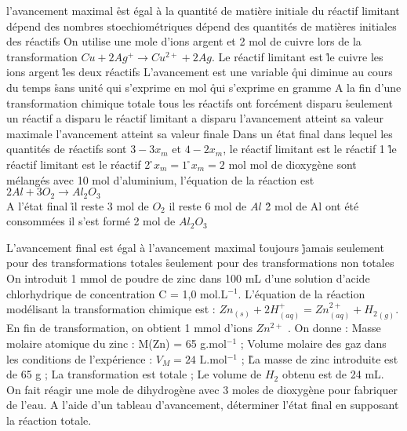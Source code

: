 \q l'avancement maximal 
\r est égal à la quantité de matière initiale du réactif limitant 
\rv dépend des nombres stoechiométriques 
\rv dépend des quantités de matières initiales des réactifs 
\q On utilise une mole d'ions argent et 2 mol de cuivre lors de la transformation $Cu+2Ag^+\longrightarrow Cu^{2+}+2Ag$. Le réactif limitant est 
\r le cuivre 
\rv les ions argent 
\r les deux réactifs 
L'avancement est une variable 
\r qui diminue au cours du temps 
\r sans unité 
\rv qui s'exprime en mol 
\r qui s'exprime en gramme 
\q A la fin d'une transformation chimique totale
\r tous les réactifs ont forcément disparu
\r  seulement un réactif a disparu 
\rv le réactif limitant a disparu 
\rv l'avancement atteint sa valeur maximale
\rv l'avancement atteint sa valeur finale 
\q Dans un état final dans lequel les quantités de réactifs sont $3 - 3 x_m$ et $4 - 2 x_m$,  
\rv le réactif limitant est le réactif 1 
\r le réactif limitant est le réactif 2
\r $x_m=1$ 
\r $x_m=2$ mol 
 mol de dioxygène sont mélangés avec 10 mol d'aluminium, l'équation de la réaction est $2Al+3O_2\rightarrow Al_2O_3$\\ A l'état final 
\r il reste 3 mol de $O_2$ 
\rv il reste 6 mol de $Al$ 
\r 2 mol de Al ont été consommées
\rv il s'est formé 2 mol de $Al_2O_3$

\q L'avancement final est égal à l'avancement maximal 
\r toujours 
\r jamais 
\rv seulement pour des transformations totales 
\r seulement pour des transformations non totales
\q	
On introduit 1 mmol de poudre de zinc dans 100 mL d’une solution d’acide chlorhydrique de concentration C = 1,0 mol.L$^{-1}$. L’équation de la réaction modélisant la transformation chimique est : $Zn_{(s)} + 2 H^+_{(aq)} = Zn^{2+}_{(aq)} + {H_2}_{(g)} $.
En fin de transformation, on obtient 1 mmol d’ions $Zn^{2+}$ .
On donne : 	Masse molaire atomique du zinc : M(Zn) = 65 g.mol$^{-1}$ ;
Volume molaire des gaz dans les conditions de l'expérience : $V_M = 24$ L.mol$^{-1}$ ; 
\r
La masse de zinc introduite est de 65 g ;
\rv
La transformation est totale ;
\rv
Le volume de $H_2$ obtenu est de 24 mL.
\q On fait réagir une mole de dihydrogène avec 3 moles de dioxygène pour fabriquer de l'eau. A l'aide d'un tableau d'avancement, déterminer l'état final en supposant la réaction totale.
